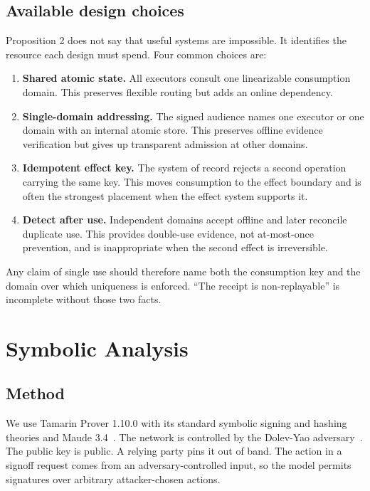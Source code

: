 \documentclass[10.5pt]{article}
\begin{document}
\subsection{Available design choices}

Proposition 2 does not say that useful systems are impossible. It identifies the
resource each design must spend. Four common choices are:

\begin{enumerate}[leftmargin=*]
\item \textbf{Shared atomic state.} All executors consult one linearizable
consumption domain. This preserves flexible routing but adds an online dependency.
\item \textbf{Single-domain addressing.} The signed audience names one executor
or one domain with an internal atomic store. This preserves offline evidence
verification but gives up transparent admission at other domains.
\item \textbf{Idempotent effect key.} The system of record rejects a second
operation carrying the same key. This moves consumption to the effect boundary
and is often the strongest placement when the effect system supports it.
\item \textbf{Detect after use.} Independent domains accept offline and later
reconcile duplicate use. This provides double-use evidence, not at-most-once
prevention, and is inappropriate when the second effect is irreversible.
\end{enumerate}

Any claim of single use should therefore name both the consumption key and the
domain over which uniqueness is enforced. ``The receipt is non-replayable'' is
incomplete without those two facts.

\section{Symbolic Analysis}

\subsection{Method}

We use Tamarin Prover 1.10.0 with its standard symbolic signing and hashing
theories and Maude 3.4~\cite{tamarin}. The network is controlled by the
Dolev-Yao adversary~\cite{dolevyao}. The
public key is public. A relying party pins it out of band. The action in a signoff
request comes from an adversary-controlled input, so the model permits signatures
over arbitrary attacker-chosen actions.
\end{document}
